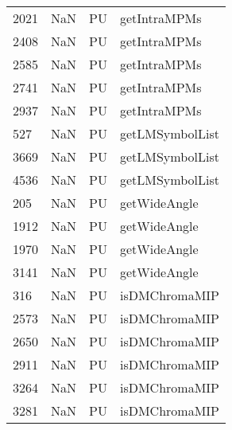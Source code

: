 \begin{tabular}{llll}
2021 &                   NaN &                         PU &                              getIntraMPMs \\
2408 &                   NaN &                         PU &                              getIntraMPMs \\
2585 &                   NaN &                         PU &                              getIntraMPMs \\
2741 &                   NaN &                         PU &                              getIntraMPMs \\
2937 &                   NaN &                         PU &                              getIntraMPMs \\
527  &                   NaN &                         PU &                           getLMSymbolList \\
3669 &                   NaN &                         PU &                           getLMSymbolList \\
4536 &                   NaN &                         PU &                           getLMSymbolList \\
205  &                   NaN &                         PU &                              getWideAngle \\
1912 &                   NaN &                         PU &                              getWideAngle \\
1970 &                   NaN &                         PU &                              getWideAngle \\
3141 &                   NaN &                         PU &                              getWideAngle \\
316  &                   NaN &                         PU &                             isDMChromaMIP \\
2573 &                   NaN &                         PU &                             isDMChromaMIP \\
2650 &                   NaN &                         PU &                             isDMChromaMIP \\
2911 &                   NaN &                         PU &                             isDMChromaMIP \\
3264 &                   NaN &                         PU &                             isDMChromaMIP \\
3281 &                   NaN &                         PU &                             isDMChromaMIP \\

\end{tabular}
